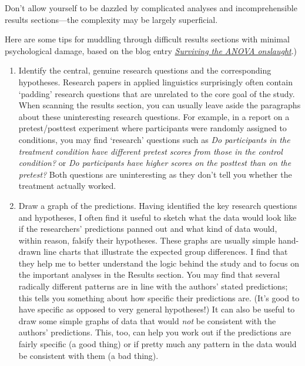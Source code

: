 \documentclass[a4paper]{tufte-book}\usepackage[]{graphicx}\usepackage[]{xcolor}
\begin{document}
\begin{framed}
 Don't allow yourself to be dazzled by complicated analyses and 
 incomprehensible results sections---the complexity may be
 largely superficial.
\end{framed}

Here are some tips for muddling through difficult results sections with minimal
psychological damage,
based on the blog entry \href{https://janhove.github.io/posts/2016-05-18-surviving-anova-onslaught/}{\textit{Surviving the ANOVA onslaught}}.)

\begin{enumerate}
  \item Identify the central, genuine research questions and the corresponding hypotheses.
Research papers in applied linguistics surprisingly often contain `padding' research questions 
that are unrelated to the core goal of the study. 
When scanning the results section, 
you can usually leave aside the paragraphs about these uninteresting research questions. 
For example, in a report on a pretest/posttest experiment where participants 
were randomly assigned to conditions, you may find `research' questions such as 
\textit{Do participants in the treatment condition have different pretest scores from those in the control condition?} 
or \textit{Do participants have higher scores on the posttest than on the pretest?} 
Both questions are uninteresting as they don't tell you whether the treatment actually worked.
  
  \item Draw a graph of the predictions.
  Having identified the key research questions and hypotheses, 
  I often find it useful to sketch what the data would look like if the 
  researchers' predictions panned out and what kind of data would, 
  within reason, falsify their hypotheses. 
  These graphs are usually simple hand-drawn line charts that 
  illustrate the expected group differences. 
  I find that they help me to better understand the logic behind the study and 
  to focus on the important analyses in the Results section.
  You may find that several radically different patterns are in line with the 
  authors' stated predictions; this tells you something about
  how specific their predictions are. 
  (It's good to have specific as opposed to very general hypotheses!)
  It can also be useful to draw some simple graphs of data that
  would \emph{not} be consistent with the authors' predictions.
  This, too, can help you work out if the predictions are fairly specific
  (a good thing) or if pretty much any pattern in the data would be
  consistent with them (a bad thing).
  

\end{enumerate}
\end{document}
